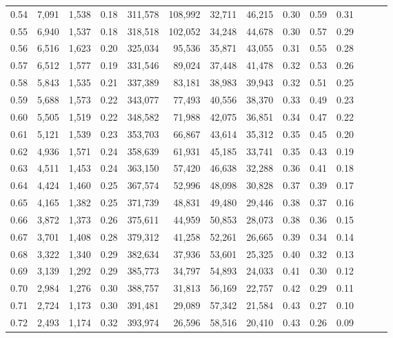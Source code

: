 \begin{tabular}{rrrrrrrrrrrrrr}
0.54 &  7,091 &  1,538 &  0.18 &  311,578 &  108,992 &  32,711 &  46,215 &  0.30 &  0.59 &      0.31 \\
0.55 &  6,940 &  1,537 &  0.18 &  318,518 &  102,052 &  34,248 &  44,678 &  0.30 &  0.57 &      0.29 \\
0.56 &  6,516 &  1,623 &  0.20 &  325,034 &   95,536 &  35,871 &  43,055 &  0.31 &  0.55 &      0.28 \\
0.57 &  6,512 &  1,577 &  0.19 &  331,546 &   89,024 &  37,448 &  41,478 &  0.32 &  0.53 &      0.26 \\
0.58 &  5,843 &  1,535 &  0.21 &  337,389 &   83,181 &  38,983 &  39,943 &  0.32 &  0.51 &      0.25 \\
0.59 &  5,688 &  1,573 &  0.22 &  343,077 &   77,493 &  40,556 &  38,370 &  0.33 &  0.49 &      0.23 \\
0.60 &  5,505 &  1,519 &  0.22 &  348,582 &   71,988 &  42,075 &  36,851 &  0.34 &  0.47 &      0.22 \\
0.61 &  5,121 &  1,539 &  0.23 &  353,703 &   66,867 &  43,614 &  35,312 &  0.35 &  0.45 &      0.20 \\
0.62 &  4,936 &  1,571 &  0.24 &  358,639 &   61,931 &  45,185 &  33,741 &  0.35 &  0.43 &      0.19 \\
0.63 &  4,511 &  1,453 &  0.24 &  363,150 &   57,420 &  46,638 &  32,288 &  0.36 &  0.41 &      0.18 \\
0.64 &  4,424 &  1,460 &  0.25 &  367,574 &   52,996 &  48,098 &  30,828 &  0.37 &  0.39 &      0.17 \\
0.65 &  4,165 &  1,382 &  0.25 &  371,739 &   48,831 &  49,480 &  29,446 &  0.38 &  0.37 &      0.16 \\
0.66 &  3,872 &  1,373 &  0.26 &  375,611 &   44,959 &  50,853 &  28,073 &  0.38 &  0.36 &      0.15 \\
0.67 &  3,701 &  1,408 &  0.28 &  379,312 &   41,258 &  52,261 &  26,665 &  0.39 &  0.34 &      0.14 \\
0.68 &  3,322 &  1,340 &  0.29 &  382,634 &   37,936 &  53,601 &  25,325 &  0.40 &  0.32 &      0.13 \\
0.69 &  3,139 &  1,292 &  0.29 &  385,773 &   34,797 &  54,893 &  24,033 &  0.41 &  0.30 &      0.12 \\
0.70 &  2,984 &  1,276 &  0.30 &  388,757 &   31,813 &  56,169 &  22,757 &  0.42 &  0.29 &      0.11 \\
0.71 &  2,724 &  1,173 &  0.30 &  391,481 &   29,089 &  57,342 &  21,584 &  0.43 &  0.27 &      0.10 \\
0.72 &  2,493 &  1,174 &  0.32 &  393,974 &   26,596 &  58,516 &  20,410 &  0.43 &  0.26 &      0.09 \\

\end{tabular}
